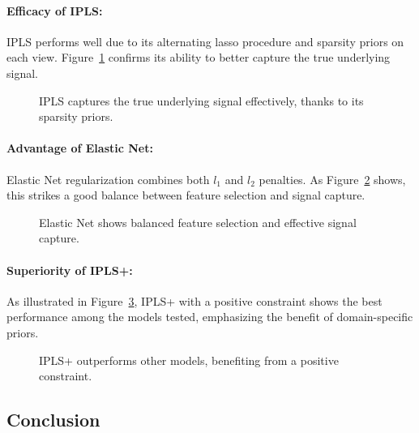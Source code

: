 \paragraph{Efficacy of IPLS:}
IPLS performs well due to its alternating lasso procedure and sparsity priors on each view. Figure~\ref{fig:IPLS_weights} confirms its ability to better capture the true underlying signal.

\begin{figure}[h]
    \centering
    
    \caption{IPLS captures the true underlying signal effectively, thanks to its sparsity priors.}
    \label{fig:IPLS_weights}
\end{figure}

\paragraph{Advantage of Elastic Net:}
Elastic Net regularization combines both $l_1$ and $l_2$ penalties. As Figure~\ref{fig:ElasticNet_weights} shows, this strikes a good balance between feature selection and signal capture.

\begin{figure}[h]
    \centering
    
    \caption{Elastic Net shows balanced feature selection and effective signal capture.}
    \label{fig:ElasticNet_weights}
\end{figure}

\paragraph{Superiority of IPLS+:}
As illustrated in Figure~\ref{fig:IPLS+_weights}, IPLS+ with a positive constraint shows the best performance among the models tested, emphasizing the benefit of domain-specific priors.

\begin{figure}[h]
    \centering
    
    \caption{IPLS+ outperforms other models, benefiting from a positive constraint.}
    \label{fig:IPLS+_weights}
\end{figure}

\subsection{Conclusion}

